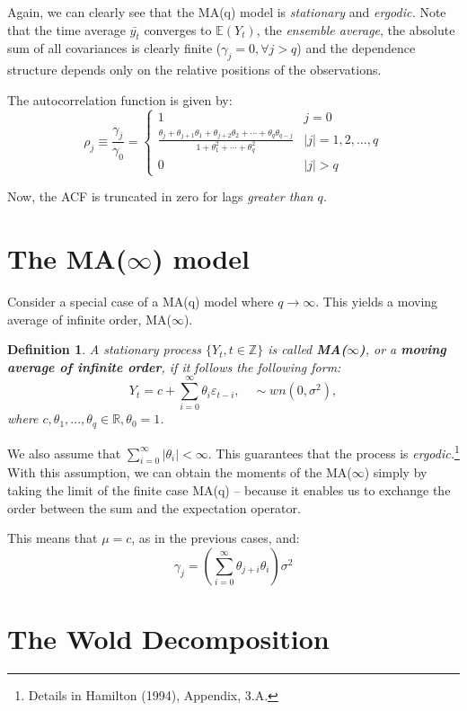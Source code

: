 \documentclass[11pt, a4paper]{report}
\theoremstyle{plain}
\theoremstyle{plain}
\newtheorem{defn}{Definition}[section]
\theoremstyle{remark}
\begin{document}
Again, we can clearly see that the MA(q) model is \textit{stationary} and \textit{ergodic.} Note that the time average $\bar{y_t}$ converges to $\mathbb{E}(Y_t)$, the \textit{ensemble average}, the absolute sum of all covariances is clearly finite ($\gamma_j = 0, \forall j > q$) and the dependence structure depends only on the relative positions of the observations.

The autocorrelation function is given by:
$$\rho_{j} \equiv \frac{\gamma_{j}}{\gamma_{0}}=\left\{\begin{array}{ll}
	1 & j=0 \\
	\frac{\theta_{j}+\theta_{j+1} \theta_{1}+\theta_{j+2} \theta_{2}+\cdots+\theta_{q} \theta_{q-j}}{1+\theta_{1}^{2}+\cdots+\theta_{q}^{2}} & |j|=1,2, \ldots, q \\
	0 & |j|>q
\end{array}\right.$$

Now, the ACF is truncated in zero for lags \textit{greater than $q$.}


\section{The MA($\infty$) model}

Consider a special case of a MA(q) model where $q \to \infty$. This yields a moving average of infinite order, MA($\infty$).

\begin{defn}
	A stationary process $\{Y_t, t \in \mathbb{Z} \}$ is called \textbf{MA($\infty$)}, or a \textbf{moving average of infinite order}, if it follows the following form:
	$$ Y_t = c + \sum_{i=0}^{\infty} \theta_i \varepsilon_{t-i}, \hspace{1em} \sim wn(0, \sigma^2), $$
	where $c, \theta_1, ..., \theta_q \in \mathbb{R}, \theta_0 = 1$.
\end{defn}

We also assume that $\sum_{i=0}^{\infty} | \theta_i | < \infty $. This guarantees that the process is \textit{ergodic.}\footnote{Details in Hamilton (1994), Appendix, 3.A.} With this assumption, we can obtain the moments of the MA($\infty$) simply by taking the limit of the finite case MA(q) -- because it enables us to exchange the order between the sum and the expectation operator.

This means that $\mu = c$, as in the previous cases, and:
$$\gamma_{j}=\left(\sum_{i=0}^{\infty} \theta_{j+i} \theta_{i}\right) \sigma^{2}$$

\section{The Wold Decomposition}
\end{document}
